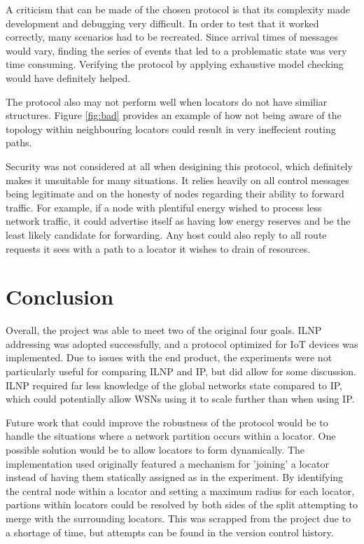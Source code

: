 \documentclass[12pt]{article}
\begin{document}
A criticism that can be made of the chosen protocol is that its complexity made development and debugging very difficult. In order to test that it worked correctly, many scenarios had to be recreated. Since arrival times of messages would vary, finding the series of events that led to a problematic state was very time consuming. Verifying the protocol by applying exhaustive model checking would have definitely helped.

The protocol also may not perform well when locators do not have similiar structures. Figure \ref{fig:bad} provides an example of how not being aware of the topology within neighbouring locators could result in very ineffecient routing paths.

Security was not considered at all when desigining this protocol, which definitely makes it unsuitable for many situations. It relies heavily on all control messages being legitimate and on the honesty of nodes regarding their ability to forward traffic. For example, if a node with plentiful energy wished to process less network traffic, it could advertise itself as having low energy reserves and be the least likely candidate for forwarding. Any host could also reply to all route requests it sees with a path to a locator it wishes to drain of resources. 

\FloatBarrier
\pagebreak
\section{Conclusion}

Overall, the project was able to meet two of the original four goals. ILNP addressing was adopted successfully, and a protocol optimized for IoT devices was implemented. Due to issues with the end product, the experiments were not particularly useful for comparing ILNP and IP, but did allow for some discussion. ILNP required far less knowledge of the global networks state compared to IP, which could potentially allow WSNs using it to scale further than when using IP. 

Future work that could improve the robustness of the protocol would be to handle the situations where a network partition occurs within a locator. One possible solution would be to allow locators to form dynamically. The implementation used originally featured a mechanism for 'joining' a locator instead of having them statically assigned as in the experiment. By identifying the central node within a locator and setting a maximum radius for each locator, partions within locators could be resolved by both sides of the split attempting to merge with the surrounding locators. This was scrapped from the project due to a shortage of time, but attempts can be found in the version control history.
\end{document}
